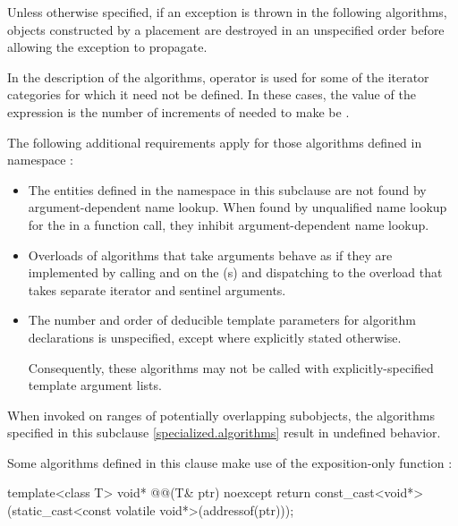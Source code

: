 \pnum
Unless otherwise specified,
if an exception is thrown in the following algorithms,
objects constructed by a placement 
are destroyed in an unspecified order
before allowing the exception to propagate.

\pnum
In the description of the algorithms, operator \tcode{-}
is used for some of the iterator categories for which
it need not be defined.
In these cases, the value of the expression 
is the number of increments of  needed to make
 be .

\pnum
The following additional requirements apply for those algorithms
defined in namespace :
\begin{itemize}
\item The entities defined in the  namespace
  in this subclause are not found by argument-dependent
  name lookup. When found by
  unqualified name lookup for the
   in a function call, they
  inhibit argument-dependent name lookup.
\item Overloads of algorithms that take  arguments
  behave as if they are implemented by calling 
  and  on the (s) and dispatching to the
  overload that takes separate iterator and sentinel arguments.
\item The number and order of deducible template parameters for algorithm declarations
  is unspecified, except where explicitly stated otherwise.
  \begin{note}
  Consequently, these algorithms may not be called with
  explicitly-specified template argument lists.
  \end{note}
\end{itemize}

\pnum
\begin{note}
When invoked on ranges of
potentially overlapping subobjects,
the algorithms specified in this subclause \ref{specialized.algorithms}
result in undefined behavior.
\end{note}

\pnum
Some algorithms defined in this clause make use of the exposition-only function
:
\begin{codeblock}
template<class T>
  void* @@(T& ptr) noexcept {
    return const_cast<void*>(static_cast<const volatile void*>(addressof(ptr)));
  }
\end{codeblock}

